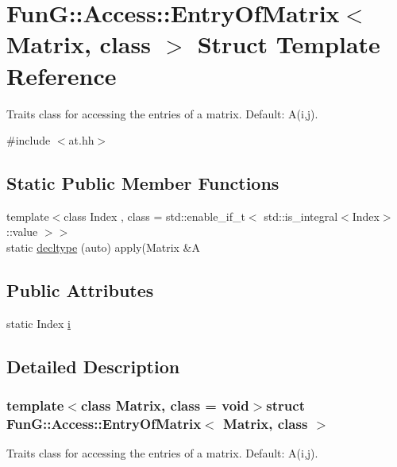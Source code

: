\hypertarget{structFunG_1_1Access_1_1EntryOfMatrix}{\section{\-Fun\-G\-:\-:\-Access\-:\-:\-Entry\-Of\-Matrix$<$ \-Matrix, class $>$ \-Struct \-Template \-Reference}
\label{structFunG_1_1Access_1_1EntryOfMatrix}
}


\-Traits class for accessing the entries of a matrix. \-Default\-: \-A(i,j).  




{\ttfamily \#include $<$at.\-hh$>$}

\subsection*{\-Static \-Public \-Member \-Functions}
\begin{DoxyCompactItemize}
\item 
{\footnotesize template$<$class Index , class  = std\-::enable\-\_\-if\-\_\-t$<$ std\-::is\-\_\-integral$<$\-Index$>$\-::value $>$$>$ }\\static \hyperlink{structFunG_1_1Access_1_1EntryOfMatrix_a168b329aaada9db5422ee7e6a0e18993}{decltype} (auto) apply(\-Matrix \&\-A
\end{DoxyCompactItemize}
\subsection*{\-Public \-Attributes}
\begin{DoxyCompactItemize}
\item 
static \-Index \hyperlink{structFunG_1_1Access_1_1EntryOfMatrix_a856ee02fa087a4bb475e0020c8f12066}{i}
\end{DoxyCompactItemize}


\subsection{\-Detailed \-Description}
\subsubsection*{template$<$class Matrix, class = void$>$struct Fun\-G\-::\-Access\-::\-Entry\-Of\-Matrix$<$ Matrix, class $>$}

\-Traits class for accessing the entries of a matrix. \-Default\-: \-A(i,j). 

